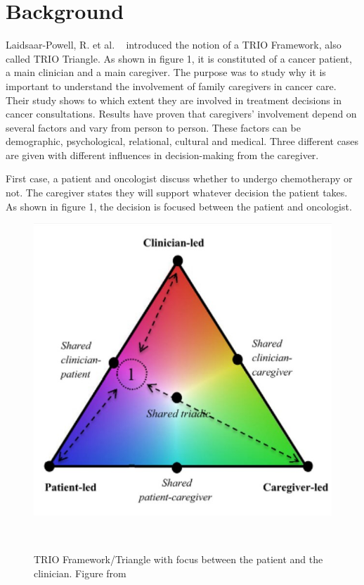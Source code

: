 \documentclass{sigchi}
\begin{document}
\section{Background}
Laidsaar-Powell, R. et al. ~\cite{Laidsaar-Powell2017} introduced the notion of a TRIO Framework, also called TRIO Triangle. As shown in figure 1, it is constituted of a cancer patient, a main clinician and a main caregiver. The purpose was to study why it is important to understand the involvement of family caregivers in cancer care. Their study shows to which extent they are involved in treatment decisions in cancer consultations. Results have proven that caregivers’ involvement depend on several factors and vary from person to person. These factors can be demographic, psychological, relational, cultural and medical. Three different cases are given with different influences in decision-making from the caregiver.

First case, a patient and oncologist discuss whether to undergo chemotherapy or not. The caregiver states they will support whatever decision the patient takes. As shown in figure 1, the decision is focused between the patient and oncologist.

\begin{figure}[H]
\centering
  \includegraphics[width=0.9\columnwidth]{figures/Triangle1Screenshot.jpg}
  \caption{TRIO Framework/Triangle with focus between the patient and the clinician. Figure from}~\label{fig:figure1}
\end{figure}
\end{document}
